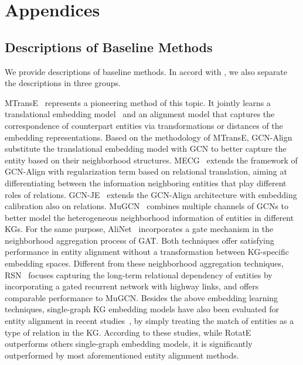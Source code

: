 \documentclass[11pt,a4paper]{article}
\begin{document}
\section{Appendices}
\label{sec:appendix}

\subsection{Descriptions of Baseline Methods}\label{sup:base}

We provide descriptions of baseline methods. In accord with , we also separate the descriptions in three groups.


MTransE~\cite{chen2017multigraph} represents a pioneering method of this topic. It jointly learns a translational embedding model~\cite{bordes2013translating} and an alignment model that captures the correspondence of counterpart entities via  transformations or distances of the embedding representations.
Based on the methodology of MTransE, GCN-Align~\cite{wang2018cross} substitute the translational embedding model with GCN to better capture the entity based on their neighborhood structures.
MECG~\cite{li2019semi} extends the framework of GCN-Align with regularization term based on relational translation, aiming at differentiating between the information neighboring entities that play different roles of relations.
GCN-JE~\cite{wu2019jointly} extends the GCN-Align architecture with embedding calibration also on relations.
MuGCN~\cite{cao2019multi} combines multiple channels of GCNs to better model the heterogeneous neighborhood information of entities in different KGs.
For the same purpose, AliNet~\cite{sun2020alinet} incorporates a gate mechanism in the neighborhood aggregation process of GAT.
Both techniques offer satisfying performance in entity alignment without a transformation between KG-specific embedding spaces.
Different from these neighborhood aggregation techniques, RSN~\cite{guo2019learning} focuses capturing the long-term relational dependency of entities by incorporating a gated recurrent network with highway links, and offers comparable performance to MuGCN.
Besides the above embedding learning techniques, single-graph KG embedding models have also been evaluated for entity alignment in recent studies~\cite{guo2019learning,sun2020alinet}, by simply treating the match of entities as a type of relation in the KG.
According to these studies, while RotatE~\cite{sun2019rotate} outperforms others single-graph embedding models, it is significantly outperformed by most aforementioned entity alignment methods.
\end{document}
